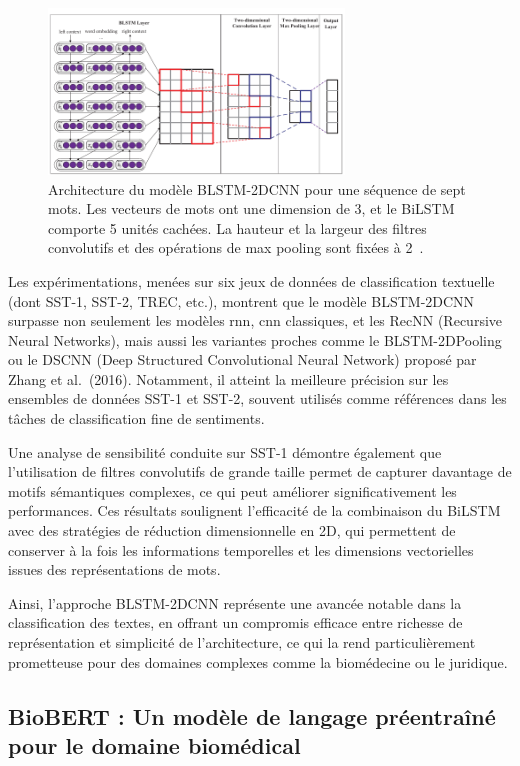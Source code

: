 \documentclass[12pt]{report}
\begin{document}
\begin{figure}[H]
    \centering
    \includegraphics[width=0.7\textwidth]{bilstm.png}
    \caption{Architecture du modèle BLSTM-2DCNN pour une séquence de sept mots. Les vecteurs de mots ont une dimension de 3, et le BiLSTM comporte 5 unités cachées. La hauteur et la largeur des filtres convolutifs et des opérations de max pooling sont fixées à 2~\cite{zhou2015text}.}
    \label{fig:bilstm-arch}
\end{figure}

Les expérimentations, menées sur six jeux de données de classification textuelle (dont SST-1, SST-2, TREC, etc.), montrent que le modèle BLSTM-2DCNN surpasse non seulement les modèles \gls{rnn}, \gls{cnn} classiques, et les RecNN (Recursive Neural Networks), mais aussi les variantes proches comme le BLSTM-2DPooling ou le DSCNN (Deep Structured Convolutional Neural Network) proposé par Zhang et al.~(2016). Notamment, il atteint la meilleure précision sur les ensembles de données SST-1 et SST-2, souvent utilisés comme références dans les tâches de classification fine de sentiments.

Une analyse de sensibilité conduite sur SST-1 démontre également que l’utilisation de filtres convolutifs de grande taille permet de capturer davantage de motifs sémantiques complexes, ce qui peut améliorer significativement les performances. Ces résultats soulignent l’efficacité de la combinaison du BiLSTM avec des stratégies de réduction dimensionnelle en 2D, qui permettent de conserver à la fois les informations temporelles et les dimensions vectorielles issues des représentations de mots.

Ainsi, l’approche BLSTM-2DCNN représente une avancée notable dans la classification des textes, en offrant un compromis efficace entre richesse de représentation et simplicité de l’architecture, ce qui la rend particulièrement prometteuse pour des domaines complexes comme la biomédecine ou le juridique.

\subsection{BioBERT : Un modèle de langage préentraîné pour le domaine biomédical}
\end{document}
